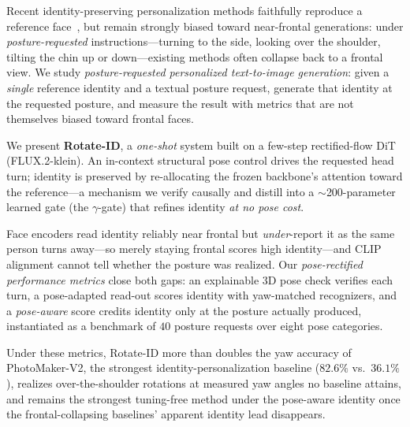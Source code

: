 Recent identity-preserving personalization methods faithfully reproduce a reference face~\cite{ipadapter,photomaker,instantid,pulid,uniportrait}, but remain strongly biased toward near-frontal generations: under \emph{posture-requested} instructions---turning to the side, looking over the shoulder, tilting the chin up or down---existing methods often collapse back to a frontal view. We study \emph{posture-requested personalized text-to-image generation}: given a \emph{single} reference identity and a textual posture request, generate that identity at the requested posture, and measure the result with metrics that are not themselves biased toward frontal faces.

We present \textbf{Rotate-ID}, a \emph{one-shot} system built on a few-step rectified-flow DiT (FLUX.2-klein). An in-context structural pose control drives the requested head turn; identity is preserved by re-allocating the frozen backbone's attention toward the reference---a mechanism we verify causally and distill into a $\sim$200-parameter learned gate (the $\gamma$-gate) that refines identity \emph{at no pose cost}.

Face encoders read identity reliably near frontal but \emph{under}-report it as the same person turns away---so merely staying frontal scores high identity---and CLIP alignment cannot tell whether the posture was realized. Our \emph{pose-rectified performance metrics} close both gaps: an explainable 3D pose check verifies each turn, a pose-adapted read-out scores identity with yaw-matched recognizers, and a \emph{pose-aware} score credits identity only at the posture actually produced, instantiated as a benchmark of $40$ posture requests over eight pose categories.

Under these metrics, Rotate-ID more than doubles the yaw accuracy of PhotoMaker-V2, the strongest identity-personalization baseline ($82.6\%$ vs.\ $36.1\%$), realizes over-the-shoulder rotations at measured yaw angles no baseline attains, and remains the strongest tuning-free method under the pose-aware identity once the frontal-collapsing baselines' apparent identity lead disappears.
